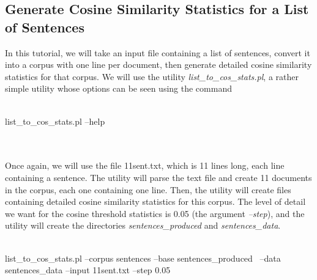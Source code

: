 \subsection{Generate Cosine Similarity Statistics for a List of Sentences}
In this tutorial, we will take an input file containing a list of sentences, convert it into a corpus with one line per document, then generate detailed cosine similarity statistics for that corpus. We will use the utility \emph{list\_to\_cos\_stats.pl}, a rather simple utility whose options can be seen using the command
\\
\\
\begin{boxedverbatim}
list_to_cos_stats.pl --help
\end{boxedverbatim}
\\
\\
Once again, we will use the file 11sent.txt, which is 11 lines long, each line containing a sentence. The utility will parse the text file and create 11 documents in the corpus, each one containing one line. Then, the utility will create files containing detailed cosine similarity statistics for this corpus. The level of detail we want for the cosine threshold statistics is 0.05 (the argument \emph{--step}), and the utility will create the directories \emph{sentences\_produced} and \emph{sentences\_data}.
\\
\\
\begin{boxedverbatim}
list_to_cos_stats.pl --corpus sentences --base sentences_produced \
 --data sentences_data --input 11sent.txt --step 0.05
\end{boxedverbatim}
